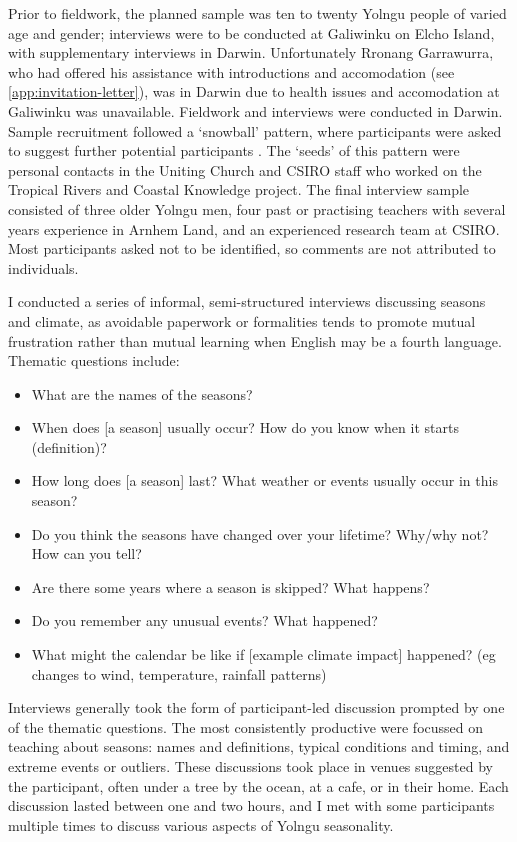 Prior to fieldwork, the planned sample was ten to twenty Yolngu people
of varied age and gender; interviews were to be conducted at Galiwinku
on Elcho Island, with supplementary interviews in Darwin.  Unfortunately
Rronang Garrawurra, who had offered his assistance with introductions
and accomodation (see \cref{app:invitation-letter}), was in Darwin due
to health issues and accomodation at Galiwinku was unavailable.
%
Fieldwork and interviews were conducted in Darwin.  Sample
recruitment followed a `snowball' pattern, where participants were asked
to suggest further potential participants \citep{patrick1996}.  The `seeds'
of this pattern were personal contacts in the Uniting Church and CSIRO
staff who worked on the Tropical Rivers and Coastal Knowledge project.
%
The final interview sample consisted of three older Yolngu men, four past
or practising teachers with several years experience in Arnhem Land, and
an experienced research team at CSIRO.  Most participants asked not to be identified, so comments
are not attributed to individuals.


I conducted a series of informal, semi-structured interviews discussing seasons
and climate, as avoidable paperwork or formalities tends to promote mutual
frustration rather than mutual learning when English may be a fourth language.
Thematic questions include:
\begin{itemize}
\item What are the names of the seasons?
\item When does [a season] usually occur?  How do you know when it starts (definition)?
\item How long does [a season] last?  What weather or events usually occur in this season?
\item Do you think the seasons have changed over your lifetime?  Why/why not?  How can you tell?
\item Are there some years where a season is skipped?  What happens?
\item Do you remember any unusual events?  What happened?
\item What might the calendar be like if [example climate impact] happened?
      (eg changes to wind, temperature, rainfall patterns)
\end{itemize}

Interviews generally took the form of participant-led discussion prompted
by one of the thematic questions.  The most consistently productive were
focussed on teaching about seasons: names and definitions, typical conditions
and timing, and extreme events or outliers.
%
These discussions took place in venues suggested by the participant, often
under a tree by the ocean, at a cafe, or in their home.  Each discussion
lasted between one and two hours, and I met with some participants multiple times
to discuss various aspects of Yolngu seasonality.

